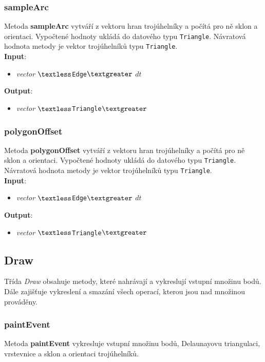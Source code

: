 \documentclass[a4paper, 12pt]{article}
\begin{document}
\subsubsection*{sampleArc}
Metoda \textbf{sampleArc} vytváří z vektoru hran trojúhelníky a počítá pro ně sklon a orientaci. Vypočtené hodnoty ukládá do datového typu \texttt{Triangle}. Návratová hodnota metody je vektor trojúhelníků typu \texttt{Triangle}.\\

\textbf{Input}:
\begin{itemize}
\item \textsl{vector} $\textless$\texttt{Edge}$\textgreater$ $dt$
\end{itemize}

\textbf{Output}:
\begin{itemize}
\item \textsl{vector} $\textless$\texttt{Triangle}$\textgreater$
\end{itemize}

\subsubsection*{polygonOffset}
Metoda \textbf{polygonOffset} vytváří z vektoru hran trojúhelníky a počítá pro ně sklon a orientaci. Vypočtené hodnoty ukládá do datového typu \texttt{Triangle}. Návratová hodnota metody je vektor trojúhelníků typu \texttt{Triangle}.\\

\textbf{Input}:
\begin{itemize}
\item \textsl{vector} $\textless$\texttt{Edge}$\textgreater$ $dt$
\end{itemize}

\textbf{Output}:
\begin{itemize}
\item \textsl{vector} $\textless$\texttt{Triangle}$\textgreater$
\end{itemize}

\subsection{Draw}
Třída \textit{Draw} obsahuje metody, které nahrávají a vykreslují vstupní množinu bodů. Dále zajišťuje vykreslení a smazání všech operací, kterou jsou nad množinou prováděny.

\subsubsection*{paintEvent}
Metoda \textbf{paintEvent} vykresluje vstupní množinu bodů, Delaunayovu triangulaci, vrstevnice a sklon a orientaci trojúhelníků.
\end{document}
